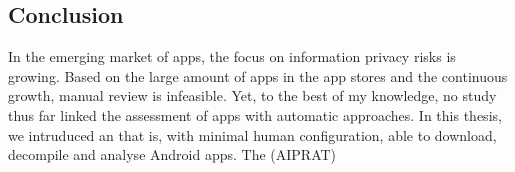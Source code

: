 \subsection{Conclusion}

In the emerging market of \mH apps, the focus on information privacy risks is growing.
Based on the large amount of apps in the app stores and the continuous growth, manual review is infeasible.
Yet, to the best of my knowledge, no study thus far linked the \ipr assessment of \mH apps with automatic \sca approaches.
In this thesis, we intruduced an \aiprat that is, with minimal human configuration, able to download, decompile and analyse Android \mH apps.
The \aiprat (AIPRAT) 

